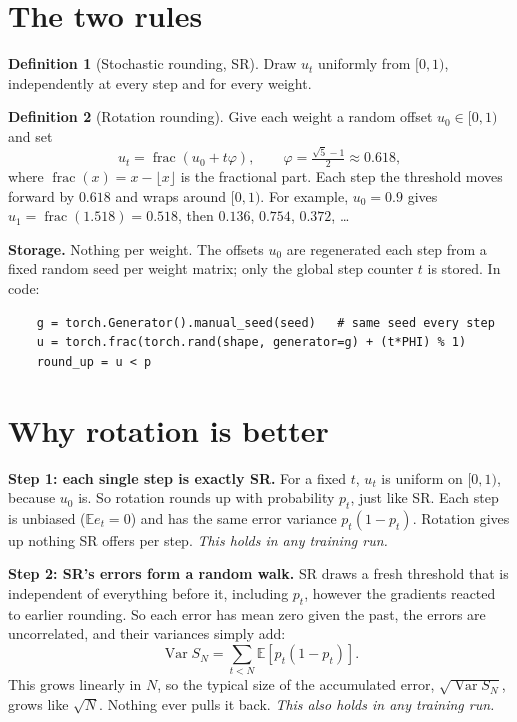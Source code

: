 \documentclass[11pt,letterpaper]{article}
\theoremstyle{definition}
\newtheorem{definition}{Definition}
\newcommand{\E}{\mathbb{E}}
\newcommand{\Var}{\operatorname{Var}}
\newcommand{\1}{\mathbf{1}}
\newcommand{\frc}{\operatorname{frac}}
\begin{document}
\section{The two rules}
\begin{definition}[Stochastic rounding, SR]
Draw $u_t$ uniformly from $[0,1)$, independently at every step and for every weight.
\end{definition}
\begin{definition}[Rotation rounding]
Give each weight a random offset $u_0\in[0,1)$ and set
\[
u_t=\frc(u_0+t\varphi),\qquad \varphi=\tfrac{\sqrt5-1}{2}\approx0.618,
\]
where $\frc(x)=x-\lfloor x\rfloor$ is the fractional part. Each step the threshold moves forward by $0.618$ and wraps
around $[0,1)$. For example, $u_0=0.9$ gives $u_1=\frc(1.518)=0.518$, then $0.136$, $0.754$, $0.372$, \ldots
\end{definition}
\textbf{Storage.} Nothing per weight. The offsets $u_0$ are regenerated each step from a fixed random seed per weight
matrix; only the global step counter $t$ is stored. In code:
\begin{verbatim}
    g = torch.Generator().manual_seed(seed)   # same seed every step
    u = torch.frac(torch.rand(shape, generator=g) + (t*PHI) % 1)
    round_up = u < p
\end{verbatim}

\section{Why rotation is better}
\textbf{Step 1: each single step is exactly SR.} For a fixed $t$, $u_t$ is uniform on $[0,1)$, because $u_0$ is.
So rotation rounds up with probability $p_t$, just like SR. Each step is unbiased ($\E e_t=0$) and has the same error
variance $p_t(1-p_t)$. Rotation gives up nothing SR offers per step. \emph{This holds in any training run.}

\textbf{Step 2: SR's errors form a random walk.} SR draws a fresh threshold that is independent of everything before
it, including $p_t$, however the gradients reacted to earlier rounding. So each error has mean zero given the past,
the errors are uncorrelated, and their variances simply add:
\begin{equation}
\Var S_N=\textstyle\sum_{t<N}\E[p_t(1-p_t)] .
\end{equation}
This grows linearly in $N$, so the typical size of the accumulated error, $\sqrt{\Var S_N}$, grows like $\sqrt N$.
Nothing ever pulls it back. \emph{This also holds in any training run.}
\end{document}
